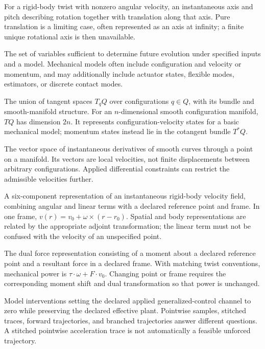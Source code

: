 \begin{description}[style=nextline,leftmargin=0pt,font=\bfseries,itemsep=0.5em]
\item[Screw Axis]
For a rigid-body twist with nonzero angular velocity, an instantaneous axis and pitch describing rotation together with translation along that axis. Pure translation is a limiting case, often represented as an axis at infinity; a finite unique rotational axis is then unavailable.

\item[State Space]
The set of variables sufficient to determine future evolution under specified inputs and a model. Mechanical models often include configuration and velocity or momentum, and may additionally include actuator states, flexible modes, estimators, or discrete contact modes.

\item[Tangent Bundle]
The union of tangent spaces $T_qQ$ over configurations $q\in Q$, with its bundle and smooth-manifold structure. For an $n$-dimensional smooth configuration manifold, $TQ$ has dimension $2n$. It represents configuration-velocity states for a basic mechanical model; momentum states instead lie in the cotangent bundle $T^*Q$.

\item[Tangent Space]
The vector space of instantaneous derivatives of smooth curves through a point on a manifold. Its vectors are local velocities, not finite displacements between arbitrary configurations. Applied differential constraints can restrict the admissible velocities further.

\item[Twist]
A six-component representation of an instantaneous rigid-body velocity field, combining angular and linear terms with a declared reference point and frame. In one frame, $v(r)=v_0+\omega\times(r-r_0)$. Spatial and body representations are related by the appropriate adjoint transformation; the linear term must not be confused with the velocity of an unspecified point.

\item[Wrench]
The dual force representation consisting of a moment about a declared reference point and a resultant force in a declared frame. With matching twist conventions, mechanical power is $\tau\cdot\omega+F\cdot v_0$. Changing point or frame requires the corresponding moment shift and dual transformation so that power is unchanged.

\item[Zero-Torque Counterfactual (ZTCF) Family]
Model interventions setting the declared applied generalized-control channel to zero while preserving the declared effective plant. Pointwise samples, stitched traces, forward trajectories, and branched trajectories answer different questions. A stitched pointwise acceleration trace is not automatically a feasible unforced trajectory.


\end{description}
